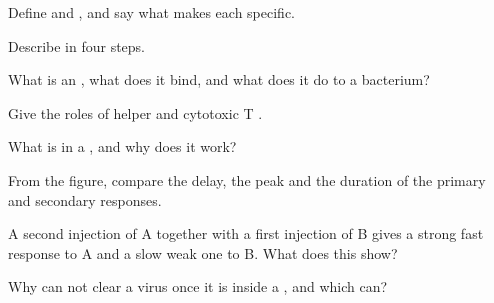 \begin{exercise}[$\star$]\label{exo:g12:adaptive-immunity:1}
Define  and , and say what makes each 
specific.
\end{exercise}

\begin{exercise}[$\star$]\label{exo:g12:adaptive-immunity:2}
Describe  in four steps.
\end{exercise}

\begin{exercise}[$\star$]\label{exo:g12:adaptive-immunity:3}
What is an , what does it bind, and what does it do to a
bacterium?
\end{exercise}

\begin{exercise}[$\star$]\label{exo:g12:adaptive-immunity:4}
Give the roles of helper and cytotoxic T .
\end{exercise}

\begin{exercise}[$\star$]\label{exo:g12:adaptive-immunity:5}
What is in a , and why does it work?
\end{exercise}

\begin{exercise}[$\star\star$]\label{exo:g12:adaptive-immunity:6}
From the  figure, compare the delay, the peak and the
duration of the primary and secondary responses.
\end{exercise}

\begin{exercise}[$\star\star$]\label{exo:g12:adaptive-immunity:7}
A second injection of  A together with a first injection of
 B gives a strong fast response to A and a slow weak one to B.
What does this show?
\end{exercise}

\begin{exercise}[$\star\star$]\label{exo:g12:adaptive-immunity:8}
Why can  not clear a virus once it is inside a , and
which  can?
\end{exercise}

